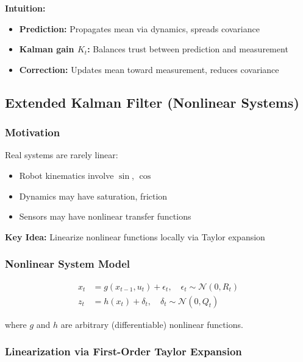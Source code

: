 \textbf{Intuition:}
\begin{itemize}
    \item \textbf{Prediction:} Propagates mean via dynamics, spreads covariance
    \item \textbf{Kalman gain $K_t$:} Balances trust between prediction and measurement
    \item \textbf{Correction:} Updates mean toward measurement, reduces covariance
\end{itemize}

\subsection{Extended Kalman Filter (Nonlinear Systems)}

\subsubsection{Motivation}

Real systems are rarely linear:
\begin{itemize}
    \item Robot kinematics involve $\sin$, $\cos$
    \item Dynamics may have saturation, friction
    \item Sensors may have nonlinear transfer functions
\end{itemize}

\textbf{Key Idea:} Linearize nonlinear functions locally via Taylor expansion

\subsubsection{Nonlinear System Model}

\begin{align}
x_t &= g(x_{t-1}, u_t) + \epsilon_t, \quad \epsilon_t \sim \mathcal{N}(0, R_t) \\
z_t &= h(x_t) + \delta_t, \quad \delta_t \sim \mathcal{N}(0, Q_t)
\end{align}

where $g$ and $h$ are arbitrary (differentiable) nonlinear functions.

\subsubsection{Linearization via First-Order Taylor Expansion}

